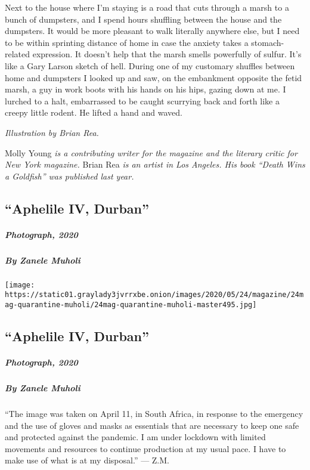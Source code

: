 Next to the house where I'm staying is a road that cuts through a marsh
to a bunch of dumpsters, and I spend hours shuffling between the house
and the dumpsters. It would be more pleasant to walk literally anywhere
else, but I need to be within sprinting distance of home in case the
anxiety takes a stomach-related expression. It doesn't help that the
marsh smells powerfully of sulfur. It's like a Gary Larson sketch of
hell. During one of my customary shuffles between home and dumpsters I
looked up and saw, on the embankment opposite the fetid marsh, a guy in
work boots with his hands on his hips, gazing down at me. I lurched to a
halt, embarrassed to be caught scurrying back and forth like a creepy
little rodent. He lifted a hand and waved.

\emph{Illustration by Brian Rea.}

Molly Young \emph{is a contributing writer for the magazine and the
literary critic for New York magazine.} Brian Rea \emph{is an artist in
Los Angeles. His book ``Death Wins a Goldfish'' was published last
year.}

\hypertarget{aphelile-iv-durban}{%
\subsection{``Aphelile IV, Durban''}\label{aphelile-iv-durban}}

\hypertarget{photograph-2020}{%
\subparagraph{Photograph, 2020}\label{photograph-2020}}

\hypertarget{by-zanele-muholi}{%
\subparagraph{By Zanele Muholi}\label{by-zanele-muholi}}

\texttt{[image: https://static01.graylady3jvrrxbe.onion/images/2020/05/24/magazine/24mag-quarantine-muholi/24mag-quarantine-muholi-master495.jpg]}

\hypertarget{aphelile-iv-durban-1}{%
\subsection{``Aphelile IV, Durban''}\label{aphelile-iv-durban-1}}

\hypertarget{photograph-2020-1}{%
\subparagraph{Photograph, 2020}\label{photograph-2020-1}}

\hypertarget{by-zanele-muholi-1}{%
\subparagraph{By Zanele Muholi}\label{by-zanele-muholi-1}}

``The image was taken on April 11, in South Africa, in response to the
emergency and the use of gloves and masks as essentials that are
necessary to keep one safe and protected against the pandemic. I am
under lockdown with limited movements and resources to continue
production at my usual pace. I have to make use of what is at my
disposal.'' --- Z.M.

